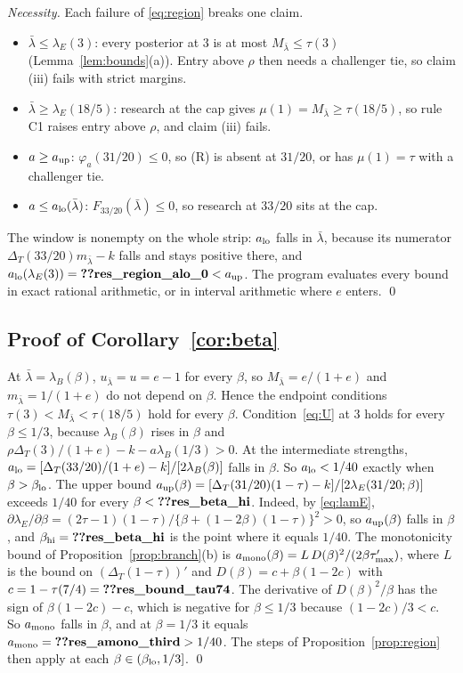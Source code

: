 \documentclass[12pt]{article}
\theoremstyle{definition}
\theoremstyle{remark}
\newcommand{\DT}{\Delta_T}
\newcommand{\lb}{\bar\lambda}
\begin{document}
\emph{Necessity.} Each failure of \eqref{eq:region} breaks one claim.
\begin{itemize}[nosep]
\item $\lb\le\lambda_E(3)$: every posterior at $3$ is at most $M_{\lb}\le\tau(3)$ (Lemma~\ref{lem:bounds}(a)). Entry
  above $\rho$ then needs a challenger tie, so claim (iii) fails with strict margins.
\item $\lb\ge\lambda_E(18/5)$: research at the cap gives $\mu(1)=M_{\lb}\ge\tau(18/5)$, so rule C1 raises entry above
  $\rho$, and claim (iii) fails.
\item $a\ge a_{\rm up}$: $\varphi_a(31/20)\le0$, so (R) is absent at $31/20$, or has $\mu(1)=\tau$ with a challenger
  tie.
\item $a\le a_{\rm lo}(\lb)$: $F_{33/20}(\lb)\le0$, so research at $33/20$ sits at the cap.
\end{itemize}
The window is nonempty on the whole strip: $a_{\rm lo}$ falls in $\lb$, because its numerator
$\DT(33/20)m_{\lb}-k$ falls and stays positive there, and $a_{\rm lo}(\lambda_E(3))=\reg{res_region_alo_0}<a_{\rm up}$.
The program evaluates every bound in exact rational arithmetic, or in interval arithmetic where $e$ enters. \qed

\subsection{Proof of Corollary~\ref{cor:beta}}

At $\lb=\lambda_B(\beta)$, $u_{\lb}=u=e-1$ for every $\beta$, so $M_{\lb}=e/(1+e)$ and $m_{\lb}=1/(1+e)$ do not
depend on $\beta$. Hence the endpoint conditions $\tau(3)<M_{\lb}<\tau(18/5)$ hold for every $\beta$.
Condition~\eqref{eq:U} at $3$ holds for every $\beta\le1/3$, because $\lambda_B(\beta)$ rises in $\beta$ and
$\rho\DT(3)/(1+e)-k-a\lambda_B(1/3)>0$. At the intermediate strengths,
$a_{\rm lo}=[\DT(33/20)/(1+e)-k]/[2\lambda_B(\beta)]$ falls in $\beta$. So $a_{\rm lo}<1/40$ exactly when
$\beta>\beta_{\rm lo}$. The upper bound $a_{\rm up}(\beta)=[\DT(31/20)(1-\tau)-k]/[2\lambda_E(31/20;\beta)]$ exceeds
$1/40$ for every $\beta<\reg{res_beta_hi}$. Indeed, by \eqref{eq:lamE},
$\partial\lambda_E/\partial\beta=(2\tau-1)(1-\tau)/\{\beta+(1-2\beta)(1-\tau)\}^2>0$, so $a_{\rm up}(\beta)$ falls in
$\beta$, and $\beta_{\rm hi}=\reg{res_beta_hi}$ is the point where it equals $1/40$. The monotonicity bound of
Proposition~\ref{prop:branch}(b) is $a_{\rm mono}(\beta)=L\,D(\beta)^2/(2\beta\tau'_{\max})$, where $L$ is the bound on
$(\DT(1-\tau))'$ and $D(\beta)=c+\beta(1-2c)$ with $c=1-\tau(7/4)=\reg{res_bound_tau74}$. The derivative of
$D(\beta)^2/\beta$ has the sign of $\beta(1-2c)-c$, which is negative for $\beta\le1/3$ because
$(1-2c)/3<c$. So $a_{\rm mono}$ falls in $\beta$, and at $\beta=1/3$ it equals $a_{\rm mono}=\reg{res_amono_third}>1/40$. The steps of Proposition~\ref{prop:region} then
apply at each $\beta\in(\beta_{\rm lo},1/3]$. \qed
\end{document}
